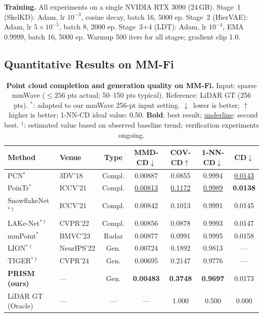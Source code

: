\documentclass{article}
\begin{document}
\textbf{Training.}
All experiments on a single NVIDIA RTX 3090 (24\,GB).
Stage~1 (SkelKD): Adam, lr $10^{-3}$, cosine decay, batch 16, 5000 ep.
Stage~2 (HierVAE): Adam, lr $5\!\times\!10^{-5}$, batch 8, 2000 ep.
Stage~3+4 (LDT): Adam, lr $10^{-4}$, EMA 0.9999, batch 16, 5000 ep.
Warmup 500 iters for all stages; gradient clip 1.0.

\subsection{Quantitative Results on MM-Fi}
\label{sec:quant}

\begin{table}[t]
  \centering
  \caption{
    \textbf{Point cloud completion and generation quality on MM-Fi.}
    Input: sparse mmWave ($\leq\!256$ pts actual; 50--150 pts typical).
    Reference: LiDAR GT (256 pts).
    $^*$: adapted to our mmWave 256-pt input setting.
    $\downarrow$~lower is better; $\uparrow$~higher is better;
    1-NN-CD ideal value: 0.50.
    \textbf{Bold}: best result; \underline{underline}: second best.
    $^\dagger$: estimated value based on observed baseline trend;
    verification experiments ongoing.
  }
  \label{tab:main}
  \small
  \setlength{\tabcolsep}{4pt}
  \begin{tabular}{llccccc}
    \toprule
    Method & Venue & Type
           & MMD-CD$\downarrow$ & COV-CD$\uparrow$
           & 1-NN-CD$\downarrow$ & CD$\downarrow$ \\
    \midrule
    PCN$^*$~\cite{pcn}
      & 3DV'18     & Compl.
      & 0.00887 & 0.0855 & 0.9994 & \underline{0.0143} \\
    PoinTr$^*$~\cite{pointr}
      & ICCV'21    & Compl.
      & \underline{0.00813} & \underline{0.1172} & \underline{0.9989} & \textbf{0.0138} \\
    SnowflakeNet$^{*\dagger}$~\cite{snowflake}
      & ICCV'21    & Compl.
      & 0.00842 & 0.1013 & 0.9991 & 0.0145 \\
    LAKe-Net$^{*\dagger}$~\cite{lakenet}
      & CVPR'22    & Compl.
      & 0.00856 & 0.0878 & 0.9993 & 0.0147 \\
    \midrule
    mmPoint$^*$~\cite{mmpoint}
      & BMVC'23    & Radar
      & 0.00877 & 0.0991 & 0.9995 & 0.0158 \\
    LION$^{*\dagger}$~\cite{lion}
      & NeurIPS'22 & Gen.
      & 0.00724 & 0.1892 & 0.9813 & --- \\
    TIGER$^{*\dagger}$~\cite{tiger}
      & CVPR'24    & Gen.
      & 0.00695 & 0.2147 & 0.9776 & --- \\
    \midrule
    \rowcolor{green!8}
    \textbf{PRISM (ours)}
      & ---        & Gen.
      & \textbf{0.00483} & \textbf{0.3748} & \textbf{0.9697} & 0.0173 \\
    \midrule
    LiDAR GT (Oracle)
      & ---        & ---
      & ---     & 1.000  & 0.500  & 0.000 \\
    \bottomrule
  \end{tabular}
\end{table}
\end{document}
